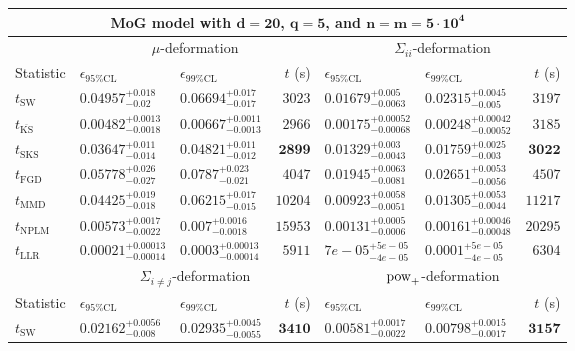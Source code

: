 \begin{tabular}{l|llr|llr}
	\toprule
	\multicolumn{7}{c}{{\bf MoG model with $\mathbf{d=20}$, $\mathbf{q=5}$, and $\mathbf{n=m=5\cdot 10^{4}}$}} \\
	\toprule
	\multicolumn{1}{c}{} & \multicolumn{3}{c}{$\mu$-deformation} & \multicolumn{3}{c}{$\Sigma_{ii}$-deformation} \\
	Statistic & $\epsilon_{95\%\mathrm{CL}}$ & $\epsilon_{99\%\mathrm{CL}}$ & $t$ (s) & $\epsilon_{95\%\mathrm{CL}}$ & $\epsilon_{99\%\mathrm{CL}}$ & $t$ (s) \\
	\midrule
	$t_{\mathrm{SW}}$ & $0.04957_{-0.02}^{+0.018}$ & $0.06694_{-0.017}^{+0.017}$ & $3023$ & $0.01679_{-0.0063}^{+0.005}$ & $0.02315_{-0.005}^{+0.0045}$ & $3197$ \\
	$t_{\overline{\mathrm{KS}}}$ & ${\mathbf{0.00482_{-0.0018}^{+0.0013}}}$ & ${\mathbf{0.00667_{-0.0013}^{+0.0011}}}$ & $2966$ & ${\mathbf{0.00175_{-0.00068}^{+0.00052}}}$ & ${\mathbf{0.00248_{-0.00052}^{+0.00042}}}$ & $3185$ \\
	$t_{\mathrm{SKS}}$ & $0.03647_{-0.014}^{+0.011}$ & $0.04821_{-0.012}^{+0.011}$ & ${\mathbf{2899}}$ & $0.01329_{-0.0043}^{+0.003}$ & $0.01759_{-0.003}^{+0.0025}$ & ${\mathbf{3022}}$ \\
	$t_{\mathrm{FGD}}$ & $0.05778_{-0.027}^{+0.026}$ & $0.0787_{-0.021}^{+0.023}$ & $4047$ & $0.01945_{-0.0081}^{+0.0063}$ & $0.02651_{-0.0056}^{+0.0053}$ & $4507$ \\
	$t_{\mathrm{MMD}}$ & $0.04425_{-0.018}^{+0.019}$ & $0.06215_{-0.015}^{+0.017}$ & $10204$ & $0.00923_{-0.0051}^{+0.0058}$ & $0.01305_{-0.0044}^{+0.0053}$ & $11217$ \\
\rowcolor{red!35}	$t_{\mathrm{NPLM}}$ & $0.00573_{-0.0022}^{+0.0017}$ & $0.007_{-0.0018}^{+0.0016}$ & $15953$ & $0.00131_{-0.0006}^{+0.0005}$ & $0.00161_{-0.00048}^{+0.00046}$ & $20295$ \\
	$t_{\mathrm{LLR}}$ & $0.00021_{-0.00014}^{+0.00013}$ & $0.0003_{-0.00014}^{+0.00013}$ & $5911$ & $7e-05_{-4e-05}^{+5e-05}$ & $0.0001_{-4e-05}^{+5e-05}$ & $6304$ \\
	\toprule
	\multicolumn{1}{c}{} & \multicolumn{3}{c}{$\Sigma_{i\neq j}$-deformation} & \multicolumn{3}{c}{$\rm{pow}_{+}$-deformation} \\
	Statistic & $\epsilon_{95\%\mathrm{CL}}$ & $\epsilon_{99\%\mathrm{CL}}$ & $t$ (s) & $\epsilon_{95\%\mathrm{CL}}$ & $\epsilon_{99\%\mathrm{CL}}$ & $t$ (s) \\
	\midrule
	$t_{\mathrm{SW}}$ & $0.02162_{-0.008}^{+0.0056}$ & $0.02935_{-0.0055}^{+0.0045}$ & ${\mathbf{3410}}$ & $0.00581_{-0.0022}^{+0.0017}$ & $0.00798_{-0.0017}^{+0.0015}$ & ${\mathbf{3157}}$ \\

\end{tabular}

